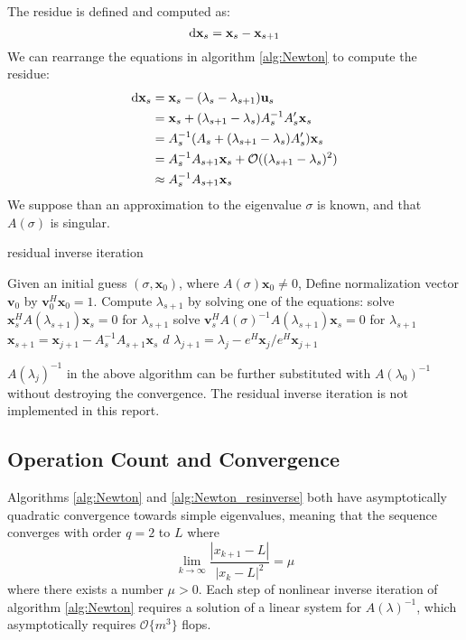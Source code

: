 \documentclass[11pt,letterpaper]{article}
\begin{document}
The residue is defined and computed as: 
\begin{equation}\label{eq:residue}
\mathrm{d} \mathbf{x}_{s} = \mathbf{x}_{s}-\mathbf{x}_{s+1}
\end{equation}
We can rearrange the equations in algorithm \ref{alg:Newton} to compute the residue:
\begin{align*}
\mathrm{d} \mathbf{x}_{s} &= \mathbf{x}_{s}-(\lambda_{s}-\lambda_{s+1})\mathbf{u}_{s} \\
&=\mathbf{x}_{s}+(\lambda_{s+1}-\lambda_{s})A_{s}^{-1} A^{\prime}_{s}\mathbf{x}_{s} \\
&=A_{s}^{-1} (A_{s} +(\lambda_{s+1}-\lambda_{s})A^{\prime}_{s} )\mathbf{x}_{s}\\
&=A_{s}^{-1} A_{s+1} \mathbf{x}_{s} + \mathcal{O}((\lambda_{s+1}-\lambda_{s})^2 )\\
&\approx A_{s}^{-1} A_{s+1} \mathbf{x}_{s}
\end{align*}
We suppose than an approximation to the eigenvalue $\sigma$ is known, and that $A(\sigma)$ is singular. 
\begin{algorithm}
\caption{residual inverse iteration}
\label{alg:Newton_resinverse}
\begin{algorithmic}
\STATE Given an initial guess $(\sigma, \mathbf{x}_0)$, where $A(\sigma)\mathbf{x}_0\neq 0$, Define normalization vector $\mathbf{v}_0$ by $\mathbf{v}_{0}^{H}\mathbf{x}_0=1$.
\STATE Compute $\lambda_{s+1}$ by solving one of the equations:
    \STATE solve $\mathbf{x}_{s}^{H} A(\lambda_{s+1}) \mathbf{x}_{s} = 0$ for $\lambda_{s+1}$
	\ELSE 
	\STATE solve $\mathbf{v}_{s}^{H}A(\sigma)^{-1}A(\lambda_{s+1})\mathbf{x}_{s}=0$ for $\lambda_{s+1}$
	\ENDIF
\STATE $\mathbf{x}_{s+1} = \mathbf{x}_{j+1} -A_{s}^{-1}A_{s+1}\mathbf{x}_s$
\STATE $d $
\STATE $\lambda_{j+1} = \lambda_j - e^H\mathbf{x}_j/e^H\mathbf{x}_{j+1} $
\ENDFOR
\end{algorithmic}
\end{algorithm}
$A(\lambda_j)^{-1}$ in the above algorithm can be further substituted with $A(\lambda_0)^{-1}$ without destroying the convergence. The residual inverse iteration is not implemented in this report. 

\subsection{Operation Count and Convergence}
Algorithms \ref{alg:Newton} and \ref{alg:Newton_resinverse} both 
have asymptotically quadratic convergence towards simple eigenvalues, meaning that the sequence converges with order $q=2$ to $L$ where 
\begin{equation}\label{eq:quadconv}
    \lim_{k \to \infty} \frac{|x_{k+1}-L|}{|x_k-L|^{2}} = \mu 
\end{equation}
where there exists a number $\mu>0$. Each step of nonlinear inverse iteration of algorithm \ref{alg:Newton} requires a solution of a linear system for $A(\lambda)^{-1}$, which asymptotically requires $\mathcal{O}\{m^3\}$ flops. 
\end{document}
